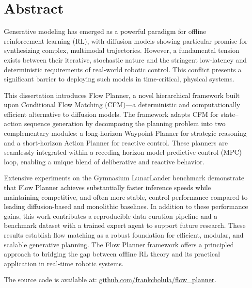 \chapter*{Abstract}
Generative modeling has emerged as a powerful paradigm for offline reinforcement learning (RL), with diffusion models showing particular promise for synthesizing complex, multimodal trajectories. However, a fundamental tension exists between their iterative, stochastic nature and the stringent low-latency and deterministic requirements of real-world robotic control. This conflict presents a significant barrier to deploying such models in time-critical, physical systems.

This dissertation introduces Flow Planner, a novel hierarchical framework built upon Conditional Flow Matching (CFM)—a deterministic and computationally efficient alternative to diffusion models. The framework adapts CFM for state–action sequence generation by decomposing the planning problem into two complementary modules: a long-horizon Waypoint Planner for strategic reasoning and a short-horizon Action Planner for reactive control. These planners are seamlessly integrated within a receding-horizon model predictive control (MPC) loop, enabling a unique blend of deliberative and reactive behavior.

Extensive experiments on the Gymnasium LunarLander benchmark demonstrate that Flow Planner achieves substantially faster inference speeds while maintaining competitive, and often more stable, control performance compared to leading diffusion-based and monolithic baselines. In addition to these performance gains, this work contributes a reproducible data curation pipeline and a benchmark dataset with a trained expert agent to support future research. These results establish flow matching as a robust foundation for efficient, modular, and scalable generative planning. The Flow Planner framework offers a principled approach to bridging the gap between offline RL theory and its practical application in real-time robotic systems.

The source code is available at: \href{https://github.com/frankcholula/flow_planner}{github.com/frankcholula/flow\_planner}.